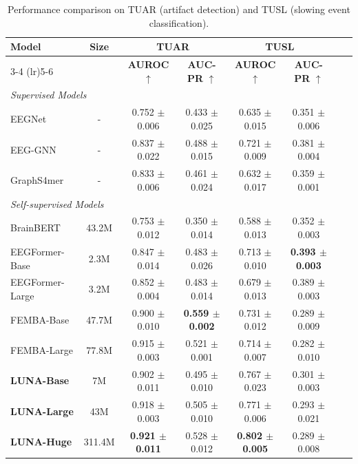 \begin{table}[htbp!]
\centering
\caption{Performance comparison on TUAR (artifact detection) and TUSL (slowing event classification). }
\label{tab:results_tuar_tusl}

\setlength{\tabcolsep}{5pt}
\small
\begin{tabular}{@{}lccccccc@{}}
\toprule
\multirow{2}{*}{\textbf{Model}} & \multirow{2}{*}{\textbf{Size}} & \multicolumn{2}{c}{\textbf{TUAR}} & \multicolumn{2}{c}{\textbf{TUSL}} \\
\cmidrule(lr){3-4} \cmidrule(lr){5-6}
 &  & \textbf{AUROC} $\uparrow$ & \textbf{AUC-PR} $\uparrow$ & \textbf{AUROC} $\uparrow$ & \textbf{AUC-PR} $\uparrow$ \\
\midrule
\multicolumn{6}{l}{\textit{Supervised Models}} \\
EEGNet~\cite{lawhern2018eegnet}       & -  & 0.752 $\pm$ 0.006 & 0.433 $\pm$ 0.025 & 0.635 $\pm$ 0.015 & 0.351 $\pm$ 0.006  \\
EEG-GNN~\cite{tang2021self}      & - & 0.837 $\pm$ 0.022 & 0.488 $\pm$ 0.015 & 0.721 $\pm$ 0.009 & 0.381 $\pm$ 0.004  \\
GraphS4mer~\cite{tang2023modeling}  & -  & 0.833 $\pm$ 0.006 & 0.461 $\pm$ 0.024 & 0.632 $\pm$ 0.017 & 0.359 $\pm$ 0.001  \\
\midrule
\multicolumn{6}{l}{\textit{Self-supervised Models}} \\
BrainBERT \citep{wang2023brainbert}    & 43.2M  & 0.753 $\pm$ 0.012 & 0.350 $\pm$ 0.014 & 0.588 $\pm$ 0.013 & 0.352 $\pm$ 0.003  \\
EEGFormer-Base \citep{chen2024eegformer}  & 2.3M & 0.847 $\pm$ 0.014 & 0.483 $\pm$ 0.026 & 0.713 $\pm$ 0.010 & \textbf{0.393 $\pm$ 0.003}  \\
EEGFormer-Large \citep{chen2024eegformer}  & 3.2M & 0.852 $\pm$ 0.004 & 0.483 $\pm$ 0.014 & 0.679 $\pm$ 0.013 & 0.389 $\pm$ 0.003  \\
FEMBA-Base \citep{tegon2025femba}  & 47.7M & 0.900 $\pm$ 0.010 & \textbf{0.559 $\pm$ 0.002} & 0.731 $\pm$ 0.012 & 0.289 $\pm$ 0.009 \\
FEMBA-Large \citep{tegon2025femba} & 77.8M  & 0.915 $\pm$ 0.003 & 0.521 $\pm$ 0.001 & 0.714 $\pm$ 0.007 & 0.282 $\pm$ 0.010 \\
\midrule
\textbf{LUNA-Base} & 7M & 0.902 $\pm$ 0.011 	 & 0.495 $\pm$	0.010 & 0.767 $\pm$	0.023 & 0.301 $\pm$	0.003 \\
\textbf{LUNA-Large} & 43M & 0.918 $\pm$	0.003	& 0.505 $\pm$	0.010 & 0.771	$\pm$ 0.006	& 0.293	$\pm $0.021  \\
\textbf{LUNA-Huge} & 311.4M & \textbf{0.921 $\pm$	0.011}	 & 0.528 $\pm$	0.012 & \textbf{0.802 $\pm$	0.005}	& 0.289	$\pm $0.008  \\
\bottomrule
\end{tabular}

\end{table}

